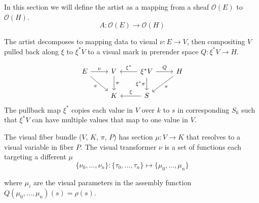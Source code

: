 \documentclass[../main.tex]{subfiles}
\begin{document}
In this section we will define the artist as a mapping from a sheaf $\mathcal{O}(E)$  to $\mathcal{O}(H)$. 
\begin{equation}
    A: \mathcal{O}(E) \rightarrow \mathcal{O}(H)
\end{equation}

The artist decomposes to mapping data to visual $\nu:E\rightarrow V$, then  compositing $V$ pulled back along $\xi$ to $\xi^*V$ to a visual mark in prerender space $Q:\xi^*V\rightarrow H$. 

\begin{equation}
    \label{eq:artist}
    \begin{tikzcd}
        E \arrow[r, "\nu"] \arrow[rd, "\pi"'] & V \arrow[d, "\pi"] & \xi^*V \arrow[r, "Q"] \arrow[d, "\xi^*\pi"'] \arrow[l, "\xi^*"'] & H \arrow[ld, "\pi"] \\
                                              & K                  & S \arrow[l, "\xi"']                                              &                    
        \end{tikzcd}
\end{equation}
The pullback map $\xi^*$ copies each value in $V$ over $k$ to $s$ in corresponding $S_k$ such that $\xi^*V$ can have multiple values that map to one value in $V$. 

The visual fiber bundle ($V$, $K$, $\pi$, $P$) has section $\mu: V \rightarrow K$ that resolves to a visual variable \cite{bertinIIPropertiesGraphic2011,munznerMarksChannels,} in fiber $P$. The visual transformer $\nu$ is a set of functions each targeting a different $\mu$
\begin{equation}
    \label{eq:nu_expanded}
    \{\nu_{0}, \ldots, \nu_{n}\}: \{\tau_{0}, \ldots, \tau_{n}\} \mapsto \{\mu_{0}, \ldots, \mu_{n}\}
\end{equation}

where $\mu_{i}$ are the visual parameters in the assembly function $Q(\mu_{0}, \ldots, \mu_{n})(s) = \rho(s)$. 
\end{document}
